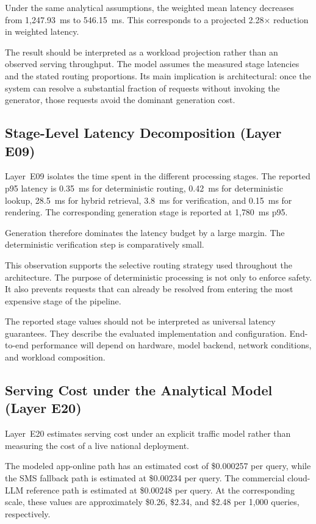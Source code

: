 \documentclass[a4paper,fleqn]{cas-dc}
\begin{document}
Under the same analytical assumptions, the weighted mean latency decreases from 1{,}247.93~ms to 546.15~ms. This corresponds to a projected 2.28$\times$ reduction in weighted latency.

The result should be interpreted as a workload projection rather than an observed serving throughput. The model assumes the measured stage latencies and the stated routing proportions. Its main implication is architectural: once the system can resolve a substantial fraction of requests without invoking the generator, those requests avoid the dominant generation cost.

\subsection{Stage-Level Latency Decomposition (Layer E09)}

Layer~E09 isolates the time spent in the different processing stages. The reported p95 latency is 0.35~ms for deterministic routing, 0.42~ms for deterministic lookup, 28.5~ms for hybrid retrieval, 3.8~ms for verification, and 0.15~ms for rendering. The corresponding generation stage is reported at 1{,}780~ms p95.

Generation therefore dominates the latency budget by a large margin. The deterministic verification step is comparatively small.

This observation supports the selective routing strategy used throughout the architecture. The purpose of deterministic processing is not only to enforce safety. It also prevents requests that can already be resolved from entering the most expensive stage of the pipeline.

The reported stage values should not be interpreted as universal latency guarantees. They describe the evaluated implementation and configuration. End-to-end performance will depend on hardware, model backend, network conditions, and workload composition.

\subsection{Serving Cost under the Analytical Model (Layer E20)}

Layer~E20 estimates serving cost under an explicit traffic model rather than measuring the cost of a live national deployment.

The modeled app-online path has an estimated cost of \$0.000257 per query, while the SMS fallback path is estimated at \$0.00234 per query. The commercial cloud-LLM reference path is estimated at \$0.00248 per query. At the corresponding scale, these values are approximately \$0.26, \$2.34, and \$2.48 per 1{,}000 queries, respectively.
\end{document}
